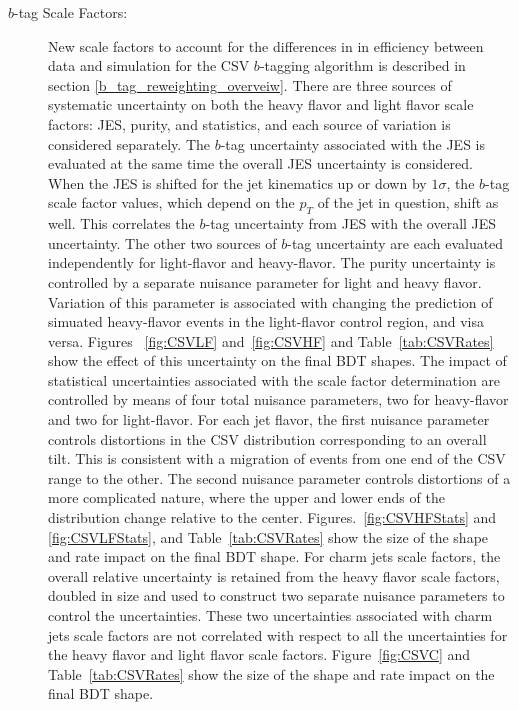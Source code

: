 \begin{description}
\item[$b$-tag Scale Factors:] New scale factors to account for the
  differences in in efficiency between data and simulation for the CSV
  $b$-tagging algorithm is described in section
  \ref{b_tag_reweighting_overveiw}.   There are three sources of
  systematic uncertainty on both the heavy flavor and light flavor
  scale factors: JES, purity, and statistics, and each source of
  variation is considered separately.  The $b$-tag uncertainty
  associated with the JES is evaluated at the same time the overall
  JES uncertainty is considered.  When the JES is shifted for the jet
  kinematics up or down by $1\sigma$, the $b$-tag scale factor values,
  which depend on the $p_{T}$ of the jet in question, shift as well.
  This correlates the $b$-tag uncertainty from JES with the overall
  JES uncertainty.  The other two sources of $b$-tag uncertainty are
  each evaluated independently for light-flavor and heavy-flavor.  The
  purity uncertainty is controlled by a separate nuisance parameter
  for light and heavy flavor.  Variation of this parameter is
  associated with changing the prediction of simuated heavy-flavor
  events in the light-flavor control region, and visa versa. Figures
  ~\ref{fig:CSVLF} and~\ref{fig:CSVHF} and Table~\ref{tab:CSVRates}
  show the effect of this uncertainty on the final BDT shapes.  The
  impact of statistical uncertainties associated with the scale factor
  determination are controlled by means of four total nuisance
  parameters, two for heavy-flavor and two for light-flavor.  For each
  jet flavor, the first nuisance parameter controls distortions in
  the CSV distribution corresponding to an overall tilt.  This is
  consistent with a migration of events from one end of the CSV range
  to the other.   The second nuisance parameter controls distortions of a more
  complicated nature, where the upper and lower ends of the
  distribution change relative to the center.
  Figures.~\ref{fig:CSVHFStats} and \ref{fig:CSVLFStats}, and
  Table~\ref{tab:CSVRates} show the size of the shape and rate impact
  on the final BDT shape.  For charm jets scale factors, the overall
  relative uncertainty is retained from the heavy flavor scale
  factors, doubled in size and used to construct two separate nuisance
  parameters to control the uncertainties. These two uncertainties
  associated with charm jets scale factors are not correlated with
  respect to all the uncertainties for the heavy flavor and light
  flavor scale factors. Figure~\ref{fig:CSVC} and
  Table~\ref{tab:CSVRates} show the size of the shape and rate impact
  on the final BDT shape.


\end{description}

